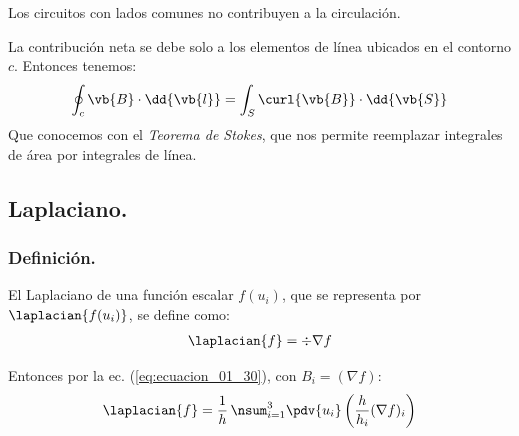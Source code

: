 Los circuitos con lados comunes no contribuyen a la circulación.
\par
La contribución neta se debe solo a los elementos de línea ubicados en el contorno $c$. Entonces tenemos:
\begin{align}
\oint_{c} \vb{B} \cdot \dd{\vb{l}} = \int_{S} \curl{\vb{B}} \cdot \dd{\vb{S}}
\label{eq:ecuacion_01_35}
\end{align}
Que conocemos con el \emph{Teorema de Stokes}, que nos permite reemplazar integrales de área por integrales de línea.

\subsection{Laplaciano.}

\subsubsection{Definición.}

El Laplaciano de una función escalar $f(u_{i})$, que se representa por $\laplacian{f(u_{i})}$, se define como:
\begin{align*}
\laplacian{f} = \div{\nabla f}
\end{align*}

Entonces por la ec. (\ref{eq:ecuacion_01_30}), con $B_{i} = (\nabla f)$:
\begin{align*}
\laplacian{f} = \dfrac{1}{h} \, \nsum_{i=1}^{3} \pdv{u_{i}} \left( \dfrac{h}{h_{i}}  (\nabla f)_{i} \right)
\end{align*}

